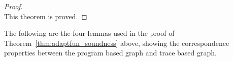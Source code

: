 \begin{proof}
%
%
%
%
\\
This theorem is proved.
\end{proof}
The following are the four lemmas used in the proof of Theorem~\ref{thm:adaptfun_soundness} above,
showing the correspondence properties between the program based graph and trace based graph.
